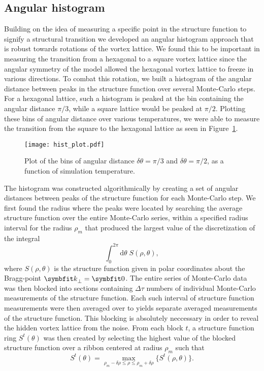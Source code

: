 \subsection{Angular histogram}

Building on the idea of measuring a specific point in the structure function to signify a structural transition we developed an angular histogram approach that is robust towards rotations of the
vortex lattice. We found this to be important in measuring the transition from a hexagonal to a square vortex lattice since the angular symmetry of the model allowed the hexagonal vortex lattice to
freeze in various directions. To combat this rotation, we built a histogram of the angular distance between peaks in the structure function over several Monte-Carlo steps. For a hexagonal
lattice, such a histogram is peaked at the bin containing  the angular distance $\pi/3$, while a square lattice would be peaked at $\pi/2$. Plotting these bins of angular distance over various
temperatures, we were able to measure the transition from the square to the hexagonal lattice as seen in Figure~\ref{fig:Vor:Symm:AH:histogram}.

\begin{figure}[h]
    \centering
    \texttt{[image: hist\_plot.pdf]}
    \caption{Plot of the bins of angular distance $\delta\theta = \pi/3$ and $\delta\theta = \pi/2$, as a function of simulation temperature.}
    \label{fig:Vor:Symm:AH:histogram}
\end{figure}

The histogram was constructed algorithmically by creating a set of angular distances between peaks of the structure function for each Monte-Carlo step. We first found the radius where the peaks were
located by searching the average structure function over the entire Monte-Carlo series, within a specified radius interval for the radius $\rho_m$ that produced the largest value of the
discretization of the integral
\begin{equation}
    \label{eq:Vor:Symm:AH:searchIntegral}
    \int_0^{2\pi}\!\!\!\!\!\!\mathrm{d}\theta\; S(\rho,\theta),
\end{equation}
where $S(\rho,\theta)$ is the structure function given in polar coordinates about the Bragg-point $\v{k}_\perp = \v{0}$. The entire series of Monte-Carlo data was then blocked into sections
containing $\Delta\tau$ numbers of individual Monte-Carlo measurements of the structure function. Each such interval of structure function measurements were then averaged over to yields separate
averaged measurements of the structure function. This blocking is absolutely neccessary in order to reveal the hidden vortex lattice from the noise. From each block $t$,
a structure function ring $S^t(\theta)$ was then created by selecting the highest value of the blocked structure function over a ribbon centered at radius $\rho_m$ such that
\begin{equation}
    \label{eq:Vor:Symm:AH:ribbonMaximum}
    S^t(\theta) = \max_{\rho_m-\delta\rho\leq\rho\leq\rho_m+\delta\rho}\{S^t(\rho,\theta)\}.
\end{equation}

